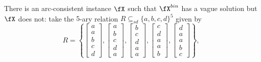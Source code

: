 \begin{ex} There is an arc-consistent instance $\fX$ such that $\fX^{bin}$ has a vague solution but $\fX$ does not: take the $5$-ary relation $R \subseteq_{sd} \{a,b,c,d\}^5$ given by
\[
R = \left\{\begin{bmatrix}a\\a\\b\\c\\d\end{bmatrix},\begin{bmatrix}a\\b\\c\\d\\a\end{bmatrix},\begin{bmatrix}b\\c\\d\\a\\a\end{bmatrix},\begin{bmatrix}c\\d\\a\\a\\b\end{bmatrix},\begin{bmatrix}d\\a\\a\\b\\c\end{bmatrix}\right\},
\]
\end{ex}

